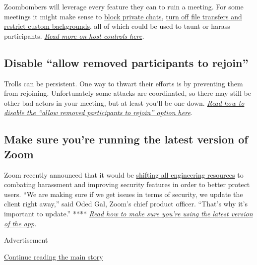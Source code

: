 Zoombombers will leverage every feature they can to ruin a meeting. For
some meetings it might make sense to
\href{https://support.zoom.us/hc/en-us/articles/115004809306-Controlling-and-Disabling-In-Meeting-Chat}{block
private chats},
\href{https://support.zoom.us/hc/en-us/articles/201362603-Host-and-Co-Host-Controls-in-a-Meeting}{turn
off file transfers and restrict custom backgrounds}, all of which could
be used to taunt or harass participants.
\href{https://support.zoom.us/hc/en-us/articles/201362603-Host-and-Co-Host-Controls-in-a-Meeting}{\emph{Read
more on host controls here}}\emph{.}

\hypertarget{disable-allow-removed-participants-to-rejoin}{%
\subsection{Disable ``allow removed participants to
rejoin''}\label{disable-allow-removed-participants-to-rejoin}}

Trolls can be persistent. One way to thwart their efforts is by
preventing them from rejoining. Unfortunately some attacks are
coordinated, so there may still be other bad actors in your meeting, but
at least you'll be one down.
\href{https://support.zoom.us/hc/en-us/articles/360021851371-Allowing-Removed-Participants-or-Panelists-to-Rejoin}{\emph{Read
how to disable the ``allow removed participants to rejoin'' option
here}}\emph{.}

\hypertarget{make-sure-youre-running-the-latest-version-of-zoom}{%
\subsection{Make sure you're running the latest version of
Zoom}\label{make-sure-youre-running-the-latest-version-of-zoom}}

Zoom recently announced that it would be
\href{https://blog.zoom.us/wordpress/2020/04/01/a-message-to-our-users/}{shifting
all engineering resources} to combating harassment and improving
security features in order to better protect users. ``We are making sure
if we get issues in terms of security, we update the client right
away,'' said Oded Gal, Zoom's chief product officer. ``That's why it's
important to update.'' ****
\href{https://support.zoom.us/hc/en-us/articles/201362233-Where-Do-I-Download-The-Latest-Version-}{\emph{Read
how to make sure you're using the latest version of the app}}\emph{.}

Advertisement

\protect\hyperlink{after-bottom}{Continue reading the main story}

